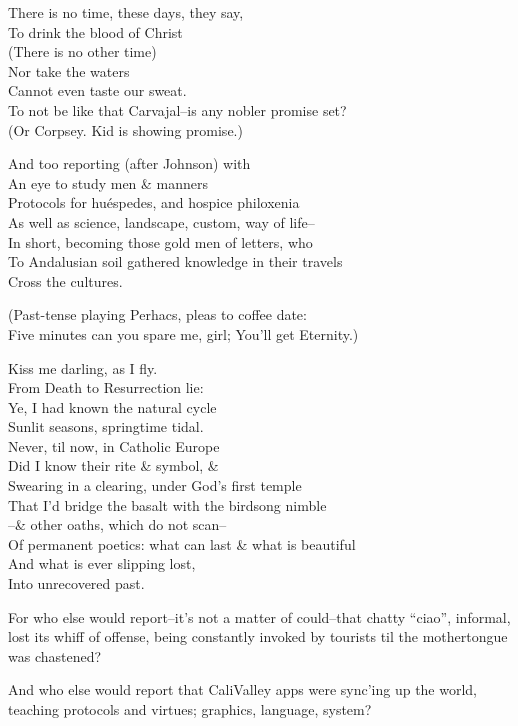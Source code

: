 There is no time, these days, they say, \\
To drink the blood of Christ \\
(There is no other time) \\
Nor take the waters \\
Cannot even taste our sweat. \\
To not be like that Carvajal--is any nobler promise set? \\
(Or Corpsey. Kid is showing promise.)

And too reporting (after Johnson) with  \\
An eye to study men \& manners \\
Protocols for huéspedes, and hospice philoxenia \\
As well as science, landscape, custom, way of life-- \\
In short, becoming those gold men of letters, who \\
To Andalusian soil gathered knowledge in their travels \\
Cross the cultures.

(Past-tense playing Perhacs, pleas to coffee date: \\
Five minutes can you spare me, girl; You'll get Eternity.)

Kiss me darling, as I fly. \\
From Death to Resurrection lie: \\
Ye, I had known the natural cycle \\
Sunlit seasons, springtime tidal. \\
Never, til now, in Catholic Europe \\
Did I know their rite \& symbol, \& \\
Swearing in a clearing, under God's first temple \\
That I'd bridge the basalt with the birdsong nimble \\
\qquad --\& other oaths, which do not scan-- \\
Of permanent poetics: what can last \& what is beautiful \\
And what is ever slipping lost, \\
Into unrecovered past.

For who else would report--it's not a matter of could--that chatty ``ciao'', informal, lost its whiff of offense, being constantly invoked by tourists til the mothertongue was chastened?

And who else would report that CaliValley apps were sync'ing up the world, teaching protocols and virtues; graphics, language, system?

